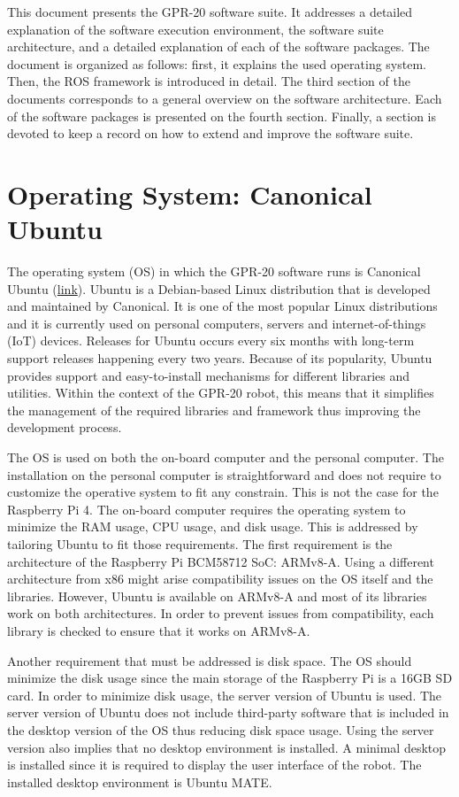 \documentclass{article}
\begin{document}
This document presents the GPR-20 software suite. It addresses a detailed explanation of the software execution environment, the software suite architecture, and a detailed explanation of each of the software packages. The document is organized as follows: first, it explains the used operating system. Then, the ROS framework is introduced in detail. The third section of the documents corresponds to a general overview on the software architecture. Each of the software packages is presented on the fourth section. Finally, a section is devoted to keep a record on how to extend and improve the software suite. 

\newpage
\section{Operating System: Canonical Ubuntu}
The operating system (OS) in which the GPR-20 software runs is Canonical Ubuntu (\href{https://ubuntu.com/}{link}). Ubuntu is a Debian-based Linux distribution that is developed and maintained by Canonical. It is one of the most popular Linux distributions and it is currently used on personal computers, servers and internet-of-things (IoT) devices. Releases for Ubuntu occurs every six months with long-term support releases happening every two years. Because of its popularity, Ubuntu provides support and easy-to-install mechanisms for different libraries and utilities. Within the context of the GPR-20 robot, this means that it simplifies the management of the required libraries and framework thus improving the development process.

The OS is used on both the on-board computer and the personal computer. The installation on the personal computer is straightforward and does not require to customize the operative system to fit any constrain. This is not the case for the Raspberry Pi 4. The on-board computer requires the operating system to minimize the RAM usage, CPU usage, and disk usage. This is addressed by tailoring Ubuntu to fit those requirements. The first requirement is the architecture of the Raspberry Pi BCM58712 SoC: ARMv8-A. Using a different architecture from x86 might arise compatibility issues on the OS itself and the libraries. However, Ubuntu is available on ARMv8-A and most of its libraries work on both architectures. In order to prevent issues from compatibility, each library is checked to ensure that it works on ARMv8-A.

Another requirement that must be addressed is disk space. The OS should minimize the disk usage since the main storage of the Raspberry Pi is a 16GB SD card. In order to minimize disk usage, the server version of  Ubuntu is used. The server version of Ubuntu does not include third-party software that is included in the desktop version of the OS thus reducing disk space usage. Using the server version also implies that no desktop environment is installed. A minimal desktop is installed since it is required to display the user interface of the robot. The installed desktop environment is Ubuntu MATE.
\end{document}
